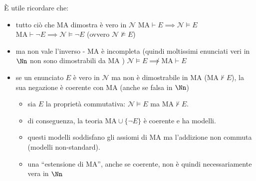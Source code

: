 \documentclass[a4paper,11pt]{report}
\begin{document}
È utile ricordare che:
\begin{itemize}
    \item tutto ciò che MA dimostra è vero in \( \mathcal{N} \)
        \subitem \( \text{MA} \vdash E \implies \mathcal{N} \models E \)
        \subitem \( \text{MA} \vdash \neg E \implies \mathcal{N} \models \neg E \) (ovvero \( \mathcal{N} \not\models E \))
    
    \item ma non vale l'inverso - MA è incompleta (quindi moltissimi enunciati veri in \( \Nn \) non sono dimostrabili da MA
        )       
        \subitem \( \mathcal{N} \models E \not\implies \text{MA} \vdash E \)

\item se un enunciato \( E \) è vero in \( \mathcal{N} \) ma non è dimostrabile in MA (\( \text{MA} \not\vdash E \)), la sua negazione è coerente con MA (anche se falsa in \( \Nn \))
\begin{itemize}
    \item sia \( E \) la proprietà commutativa: \( \mathcal{N} \models E \) ma \( \text{MA} \not\vdash E \).
    \item di conseguenza, la teoria \( \text{MA} \cup \{\neg E\} \) è coerente e ha modelli.
    \item questi modelli soddisfano gli assiomi di MA ma l'addizione non commuta (modelli non-standard).
    \item una ``estensione di MA'', anche se coerente, non è quindi necessariamente vera in \( \Nn \)
\end{itemize}

\end{itemize}
\end{document}
